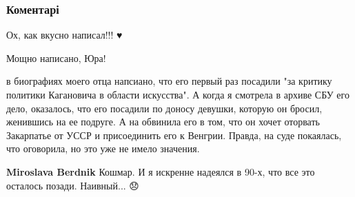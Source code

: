  
 
 
 
 
\subsubsection{Коментарі}

\begin{itemize}
 
Ох, как вкусно написал!!! ♥️

 
Мощно написано, Юра!

 

в биографиях моего отца напсиано, что его первый раз посадили "за критику
политики Кагановича в области искусства". А когда я смотрела в архиве СБУ его
дело, оказалось, что его посадили по доносу девушки, которую он бросил,
женившись на ее подруге. А на обвинила его в том, что он хочет оторвать
Закарпатье от УССР и присоединить его к Венгрии. Правда, на суде покаялась, что
оговорила, но это уже не имело значения.

\begin{itemize}
 
\textbf{Miroslava Berdnik} Кошмар. И я искренне надеялся в 90-х, что все это осталось позади. Наивный... 😞
\end{itemize}


\end{itemize}
